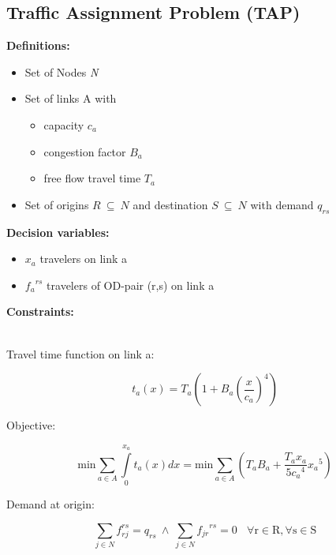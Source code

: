 \documentclass[a4paper, 12pt]{article}
\begin{document}
\subsection{Traffic Assignment Problem (TAP)}
\vspace{5mm}
\begin{large}\textbf{Definitions:}\end{large}
\begin{itemize}
\item Set of Nodes \textit{N}
\item Set of links A with
\begin{itemize}
\item capacity $c_{a}$
\item congestion factor $B_{a}$
\item free flow travel time $T_{a}$
\end{itemize}
\item Set of origins $R\ \subseteq\ N$ and destination $S\ \subseteq\ N$ with demand $q_{rs}$ 
\end{itemize}
\begin{large}\textbf{Decision variables:}\end{large}
\begin{itemize}
\item $x_{a}$ travelers on link a
\item ${f_{a}}^{rs}$ travelers of OD-pair (r,s) on link a
\end{itemize}
\begin{large}\textbf{Constraints:}\end{large}\\
Travel time function on link a: 
\begin{large}
\boldmath\begin{equation*}
t_{a}\left(x\right) = T_{a}\left(1+B_{a}\left(\frac{x}{c_a}\right)^4\right)
\end{equation*}
\end{large}
Objective:
\begin{large}
\boldmath\begin{equation*}
\mathrm{min}\sum_{a\in{A}} \int\limits_{0}^{x_a}t_{a}\left(x\right)dx = \mathrm{min}\sum_{a\in{A}}\left(T_{a}B_{a}+\frac{T_{a}x_{a}}{5{c_{a}}^4}{x_{a}}^5\right) 
\end{equation*}
\end{large}
Demand at origin: 
\begin{large}
\boldmath\begin{equation*}
\sum_{j\in{N}} f_{rj}^{rs} = q_{rs}\  \wedge \ \sum_{j\in{N}} {f_{jr}}^{rs} = 0 \ \ \ \ \mathrm{\forall{r}\in{R},\forall{s}\in{S}} 
\end{equation*}
\end{large}
\end{document}
